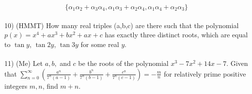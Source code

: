 \documentclass{article}
\begin{document}
\begin{equation*} \{ \alpha_1\alpha_2+\alpha_3\alpha_4,\alpha_1\alpha_3+\alpha_2\alpha_4,\alpha_1\alpha_4+\alpha_2\alpha_3 \}
\end{equation*}
\\
10) (HMMT) How many real triples (a,b,c) are there such that the polynomial $p(x)=x^4+ax^3+bx^2+ax+c$ has exactly three distinct roots, which are equal to $\tan y$, $\tan 2y$, $\tan 3y$ for some real $y$.
\\
\\
11) (Me) Let $a,b,$ and $c$ be the roots of the polynomial $x^3-7 x^2+14 x-7$. Given that $\displaystyle\sum\limits_{n=0}^{\infty} \left(\frac{a^n}{7^n(a-1)}+\frac{b^n}{7^n(b-1)}+\frac{c^n}{7^n(c-1)}\right)=-\frac{m}{n}$ for relatively prime positive integers $m,n$, find $m+n$.
\\
\end{document}
